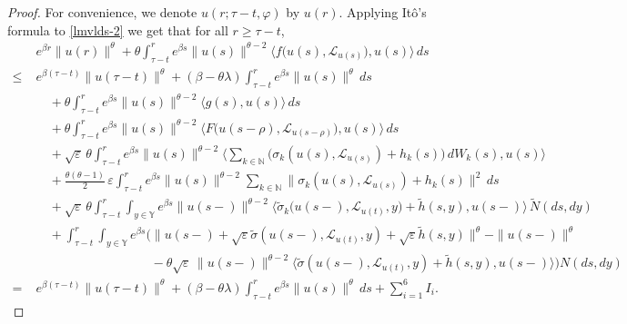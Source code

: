 \documentclass[11pt]{article}
\numberwithin{equation}{section}
\theoremstyle{plain}
\begin{document}
\begin{proof}
	For convenience, we denote $u(r;\tau-t,\varphi)$ by $u(r)$.
	Applying It\^o's formula to \eqref{lmvlds-2}  we get 
	 that for all $r \ge \tau - t$,
\begin{align}\label{thetapue-1}
	& e^{\beta r} \|u(r)\|^\theta
	+ \theta \int_{\tau-t}^{r}
	e^{\beta s} \|u(s)\|^{\theta-2}
	\big\langle f\big(u(s), \mathcal{L}_{u(s)}\big), u(s) \big\rangle \, ds
	\nonumber\\
	\le\; &
	e^{\beta(\tau-t)} \|u(\tau-t)\|^{\theta}
	+ (\beta - \theta \lambda)
	\int_{\tau-t}^{r} e^{\beta s} \|u(s)\|^\theta \, ds
	\nonumber\\
	& \quad
	+ \theta \int_{\tau-t}^{r}
	e^{\beta s} \|u(s)\|^{\theta-2}
	\langle g(s), u(s) \rangle \, ds
	\nonumber\\
	& \quad
	+ \theta \int_{\tau-t}^{r}
	e^{\beta s} \|u(s)\|^{\theta-2}
	\big\langle F\big(u(s-\rho), \mathcal{L}_{u(s-\rho)}\big), u(s) \big\rangle
	\, ds
	\nonumber\\
	& \quad
	+ \sqrt{\varepsilon}\,\theta \int_{\tau-t}^{r}
	e^{\beta s} \|u(s)\|^{\theta-2}
	\big\langle
	\sum_{k \in \mathbb{N}}
	\big( \sigma_k(u(s), \mathcal{L}_{u(s)}) + h_k(s) \big) \, dW_k(s),
	u(s)
	\big\rangle
	\nonumber\\
	& \quad
	+ \frac{\theta(\theta-1)}{2}\,
	\varepsilon \int_{\tau-t}^{r}
	e^{\beta s} \|u(s)\|^{\theta-2}
	\sum_{k \in \mathbb{N}}
	\| \sigma_k(u(s), \mathcal{L}_{u(s)}) + h_k(s) \|^2 \, ds
	\nonumber\\
	& \quad
	+ \sqrt{\varepsilon}\,\theta 
	\int_{\tau-t}^{r} \int_{
	y\in\mathbb{Y}
	}
	e^{\beta s} \|u(s-)\|^{\theta-2}
	\big\langle
	\widetilde{\sigma}_k\big(u(s-), \mathcal{L}_{u(t)}, y\big)
	+ \widetilde{h}(s,y),
	u(s-)
	\big\rangle
	\,\widetilde{N}(ds,dy)
	\nonumber\\
	& \quad
	+  
	\int_{\tau-t}^{r} \int_{
	y\in\mathbb{Y}
	} e^{\beta s}
	\Big(
	\| u(s-)
	+ \sqrt{\varepsilon} \widetilde{\sigma}(u(s-), \mathcal{L}_{u(t)}, y)
	+ \sqrt{\varepsilon} \widetilde{h}(s,y) \|^\theta
	- \|u(s-)\|^\theta
	\nonumber\\
	& \qquad\qquad\qquad\qquad\quad
	- \theta \sqrt{\varepsilon}\, \|u(s-)\|^{\theta-2}
	\big\langle
	\widetilde{\sigma}(u(s-), \mathcal{L}_{u(t)}, y)
	+ \widetilde{h}(s,y),
	u(s-)
	\big\rangle
	\Big) N(ds,dy)
	\nonumber\\
	=\; &
	e^{\beta(\tau-t)} \|u(\tau-t)\|^{\theta}
	+ (\beta - \theta \lambda)
	\int_{\tau-t}^{r} e^{\beta s} \|u(s)\|^\theta \, ds
	+ \sum_{i=1}^{6} I_i .
\end{align}

\end{proof}
\end{document}
